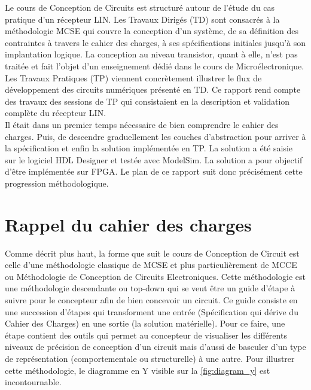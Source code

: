 
Le cours de Conception de Circuits est structuré autour de l'étude du cas pratique d'un récepteur LIN. Les Travaux Dirigés (TD) sont consacrés à la méthodologie MCSE qui couvre la conception d'un système, de sa définition des contraintes à travers le cahier des charges, à ses spécifications initiales jusqu'à son implantation logique. La conception au niveau transistor, quant à elle, n'est pas traitée et fait l'objet d'un enseignement dédié dans le cours de Microélectronique.
\\

Les Travaux Pratiques (TP) viennent concrètement illustrer le flux de développement des circuits numériques présenté en TD. Ce rapport rend compte des travaux des sessions de TP qui consistaient en la description et validation complète du récepteur LIN.
\\

Il était dans un premier temps nécessaire de bien comprendre le cahier des charges. Puis, de descendre graduellement les couches d'abstraction pour arriver à la spécification et enfin la solution implémentée en TP.
La solution a été saisie sur le logiciel HDL Designer et testée avec ModelSim. La solution a pour objectif d’être implémentée sur FPGA. Le plan de ce rapport suit donc précisément cette progression méthodologique.

\newpage
\section{Rappel du cahier des charges}

Comme décrit plus haut, la forme que suit le cours de Conception de Circuit est celle d'une méthodologie classique de MCSE et plus particulièrement de MCCE ou Méthodologie de Conception de Circuits Electroniques. Cette méthodologie est une méthodologie descendante ou top-down qui se veut être un guide d'étape à suivre pour le concepteur afin de bien concevoir un circuit. Ce guide consiste en une succession d'étapes qui transforment une entrée (Spécification qui dérive du Cahier des Charges) en une sortie (la solution matérielle). Pour ce faire, une étape contient des outils qui permet au concepteur de visualiser les différents niveaux de précision de conception d'un circuit mais d'aussi de basculer d'un type de représentation (comportementale ou structurelle) à une autre.
Pour illustrer cette méthodologie, le diagramme en Y visible sur la \autoref{fig:diagram_y} est incontournable.

